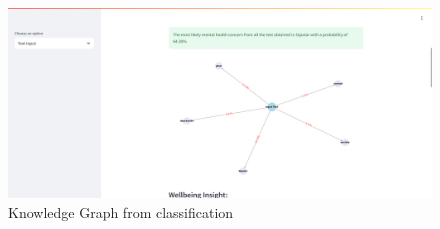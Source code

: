 \begin{figure}[h!]  
    \centering
    \includegraphics[width=1.0\textwidth]{App Images/19 Interface.png}  
    \caption{Knowledge Graph from classification}
    \label{10i23445}  %
\end{figure} 

